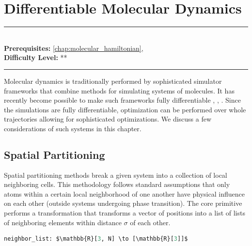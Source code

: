 \documentclass[book.tex]{subfiles}
\begin{document}
\chapter{Differentiable Molecular Dynamics}
\label{chap:differentiable_md}
\noindent\rule{11cm}{0.4pt} \\
\textbf{Prerequisites:}  \autoref{chap:molecular_hamiltonian},   \\
\textbf{Difficulty Level:} ** \\
\noindent\rule{11cm}{0.4pt}
\vspace{5mm}

Molecular dynamics is traditionally performed by sophisticated simulator frameworks that combine methods for simulating systems of molecules. It has recently become possible to make such frameworks fully differentiable  \cite{schoenholz2020jax}, \cite{merchant2021learn2hop}, \cite{goodrich2021designing}. Since the simulations are fully differentiable, optimization can be performed over whole trajectories allowing for sophisticated optimizations. We discuss a few considerations of such systems in this chapter.

\section{Spatial Partitioning}

Spatial partitioning methods break a given system into a collection of local neighboring cells. This methodology follows standard assumptions that only atoms within a certain local neighborhood of one another have physical influence on each other (outside systems undergoing phase transition). The core primitive performs a transformation that transforms a vector of positions into a list of lists of neighboring elements within distance $\sigma$ of each other.

\begin{lstlisting}[language=python]
neighbor_list: $\mathbb{R}[3, N] \to [\mathbb{R}[3]]$
\end{lstlisting}

%

\end{document}
